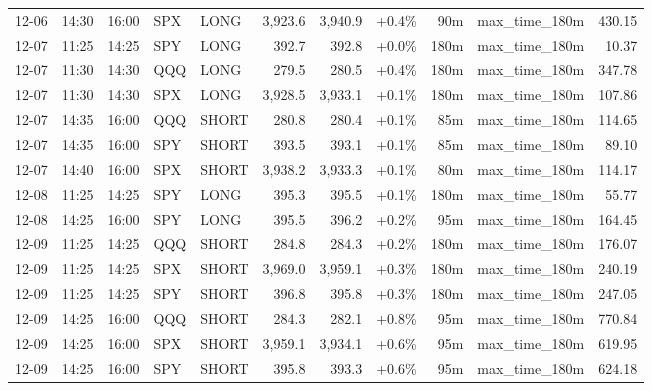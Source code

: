 \documentclass[11pt,a4paper,twoside]{article}
\begin{document}
\begin{center}
\begin{longtable}{>{\color{txtmain}}l l l l l r r r r >{\color{txtmain}}l r}
12-06 & 14:30 & 16:00 & SPX & LONG & 3,923.6 & 3,940.9 & \textcolor{wingreen}{+0.4\%} & 90m & max\_time\_180m & \textcolor{wingreen}{430.15} \\
12-07 & 11:25 & 14:25 & SPY & LONG & 392.7 & 392.8 & \textcolor{wingreen}{+0.0\%} & 180m & max\_time\_180m & \textcolor{wingreen}{10.37} \\
12-07 & 11:30 & 14:30 & QQQ & LONG & 279.5 & 280.5 & \textcolor{wingreen}{+0.4\%} & 180m & max\_time\_180m & \textcolor{wingreen}{347.78} \\
12-07 & 11:30 & 14:30 & SPX & LONG & 3,928.5 & 3,933.1 & \textcolor{wingreen}{+0.1\%} & 180m & max\_time\_180m & \textcolor{wingreen}{107.86} \\
12-07 & 14:35 & 16:00 & QQQ & SHORT & 280.8 & 280.4 & \textcolor{wingreen}{+0.1\%} & 85m & max\_time\_180m & \textcolor{wingreen}{114.65} \\
12-07 & 14:35 & 16:00 & SPY & SHORT & 393.5 & 393.1 & \textcolor{wingreen}{+0.1\%} & 85m & max\_time\_180m & \textcolor{wingreen}{89.10} \\
12-07 & 14:40 & 16:00 & SPX & SHORT & 3,938.2 & 3,933.3 & \textcolor{wingreen}{+0.1\%} & 80m & max\_time\_180m & \textcolor{wingreen}{114.17} \\
12-08 & 11:25 & 14:25 & SPY & LONG & 395.3 & 395.5 & \textcolor{wingreen}{+0.1\%} & 180m & max\_time\_180m & \textcolor{wingreen}{55.77} \\
12-08 & 14:25 & 16:00 & SPY & LONG & 395.5 & 396.2 & \textcolor{wingreen}{+0.2\%} & 95m & max\_time\_180m & \textcolor{wingreen}{164.45} \\
12-09 & 11:25 & 14:25 & QQQ & SHORT & 284.8 & 284.3 & \textcolor{wingreen}{+0.2\%} & 180m & max\_time\_180m & \textcolor{wingreen}{176.07} \\
12-09 & 11:25 & 14:25 & SPX & SHORT & 3,969.0 & 3,959.1 & \textcolor{wingreen}{+0.3\%} & 180m & max\_time\_180m & \textcolor{wingreen}{240.19} \\
12-09 & 11:25 & 14:25 & SPY & SHORT & 396.8 & 395.8 & \textcolor{wingreen}{+0.3\%} & 180m & max\_time\_180m & \textcolor{wingreen}{247.05} \\
12-09 & 14:25 & 16:00 & QQQ & SHORT & 284.3 & 282.1 & \textcolor{wingreen}{+0.8\%} & 95m & max\_time\_180m & \textcolor{wingreen}{770.84} \\
12-09 & 14:25 & 16:00 & SPX & SHORT & 3,959.1 & 3,934.1 & \textcolor{wingreen}{+0.6\%} & 95m & max\_time\_180m & \textcolor{wingreen}{619.95} \\
12-09 & 14:25 & 16:00 & SPY & SHORT & 395.8 & 393.3 & \textcolor{wingreen}{+0.6\%} & 95m & max\_time\_180m & \textcolor{wingreen}{624.18} \\

\end{longtable}
\end{center}
\end{document}
